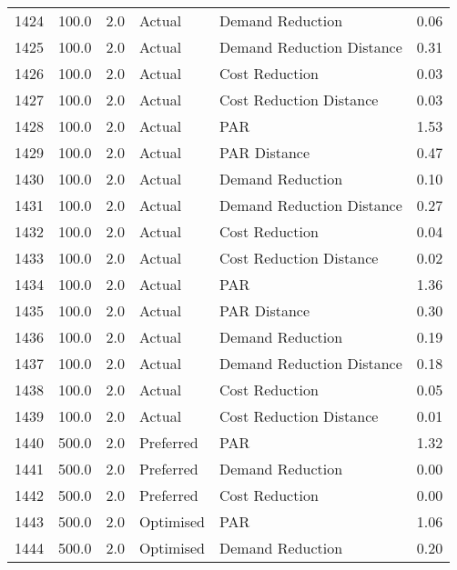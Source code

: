 \begin{longtable}{lrrllr}
1424 &        100.0 &     2.0 &         Actual &           Demand Reduction &   0.06 \\
1425 &        100.0 &     2.0 &         Actual &  Demand Reduction Distance &   0.31 \\
1426 &        100.0 &     2.0 &         Actual &             Cost Reduction &   0.03 \\
1427 &        100.0 &     2.0 &         Actual &    Cost Reduction Distance &   0.03 \\
1428 &        100.0 &     2.0 &         Actual &                        PAR &   1.53 \\
1429 &        100.0 &     2.0 &         Actual &               PAR Distance &   0.47 \\
1430 &        100.0 &     2.0 &         Actual &           Demand Reduction &   0.10 \\
1431 &        100.0 &     2.0 &         Actual &  Demand Reduction Distance &   0.27 \\
1432 &        100.0 &     2.0 &         Actual &             Cost Reduction &   0.04 \\
1433 &        100.0 &     2.0 &         Actual &    Cost Reduction Distance &   0.02 \\
1434 &        100.0 &     2.0 &         Actual &                        PAR &   1.36 \\
1435 &        100.0 &     2.0 &         Actual &               PAR Distance &   0.30 \\
1436 &        100.0 &     2.0 &         Actual &           Demand Reduction &   0.19 \\
1437 &        100.0 &     2.0 &         Actual &  Demand Reduction Distance &   0.18 \\
1438 &        100.0 &     2.0 &         Actual &             Cost Reduction &   0.05 \\
1439 &        100.0 &     2.0 &         Actual &    Cost Reduction Distance &   0.01 \\
1440 &        500.0 &     2.0 &      Preferred &                        PAR &   1.32 \\
1441 &        500.0 &     2.0 &      Preferred &           Demand Reduction &   0.00 \\
1442 &        500.0 &     2.0 &      Preferred &             Cost Reduction &   0.00 \\
1443 &        500.0 &     2.0 &      Optimised &                        PAR &   1.06 \\
1444 &        500.0 &     2.0 &      Optimised &           Demand Reduction &   0.20 \\

\end{longtable}
